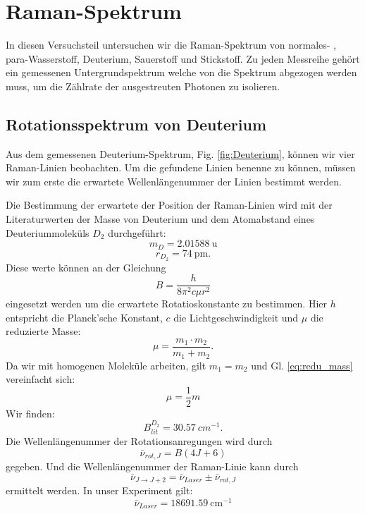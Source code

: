 \documentclass[11 pt]{article}
\begin{document}
\section{Raman-Spektrum}
In diesen Versuchsteil untersuchen wir die Raman-Spektrum von normales- , para-Wasserstoff, Deuterium, Sauerstoff und Stickstoff. Zu jeden Messreihe gehört ein gemessenen Untergrundspektrum welche von die Spektrum abgezogen werden muss, um die Zählrate der ausgestreuten Photonen zu isolieren. 

\subsection{Rotationsspektrum von Deuterium}
Aus dem gemessenen Deuterium-Spektrum, Fig. \ref{fig:Deuterium}, können wir vier Raman-Linien beobachten. Um die gefundene Linien benenne zu können, müssen wir zum erste die erwartete Wellenlängenummer der Linien bestimmt werden.

Die Bestimmung der erwartete der Position der Raman-Linien wird mit der Literaturwerten der Masse von Deuterium und dem Atomabstand eines Deuteriummoleküls $D_2$ durchgeführt:
$$m_{D} =\SI{2.01588}{\atomicmassunit}$$
$$r_{D_2} = \SI{74}{\pm}.$$
Diese werte können an der Gleichung
\begin{equation}
\label{eq:Rot_const}
B = \frac{h}{8\pi^2 c \mu r^2}
\end{equation}
eingesetzt werden um die erwartete Rotatioskonstante zu bestimmen. Hier $h$ entspricht die Planck'sche Konstant, $c$ die Lichtgeschwindigkeit und $\mu$ die reduzierte Masse:
\begin{equation}
\label{eq:redu_mass}
\mu = \dfrac{m_1\cdot m_2}{m_1 + m_2}.
\end{equation}
Da wir mit homogenen Moleküle arbeiten, gilt $m_1 = m_2$ und Gl. \ref{eq:redu_mass} vereinfacht sich:
\begin{equation}
\mu = \dfrac{1}{2} m
\end{equation}
Wir finden: 
$$B_{lit}^{D_2} = \SI{30.57}{cm^{-1}}.$$
Die Wellenlängenummer der Rotationsanregungen wird durch
\begin{equation}
\label{eq:nu_rot,j} 
\bar{\nu}_{rot,J} = B(4J+6)
\end{equation}
gegeben. Und die Wellenlängenummer der Raman-Linie kann durch
\begin{equation}
\bar{\nu}_{J\to J+2} = \bar{\nu}_{Laser}\pm \bar{\nu}_{rot,J}
\end{equation}
ermittelt werden. In unser Experiment gilt:
$$\bar{\nu}_{Laser} = \SI{18691.59}{\centi\meter^{-1}}$$
\end{document}
